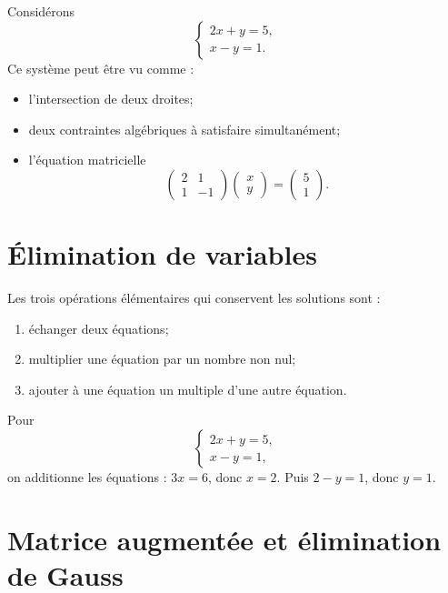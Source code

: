 Considérons
\[
\begin{cases}
2x+y=5,\\
x-y=1.
\end{cases}
\]
Ce système peut être vu comme :
\begin{itemize}
\item l'intersection de deux droites;
\item deux contraintes algébriques à satisfaire simultanément;
\item l'équation matricielle
\[
\begin{pmatrix}2&1\\1&-1\end{pmatrix}
\begin{pmatrix}x\\y\end{pmatrix}
=
\begin{pmatrix}5\\1\end{pmatrix}.
\]
\end{itemize}

\section{Élimination de variables}
\label{manual:section:12.02}

\begin{methodbox}
Les trois opérations élémentaires qui conservent les solutions sont :
\begin{enumerate}
\item échanger deux équations;
\item multiplier une équation par un nombre non nul;
\item ajouter à une équation un multiple d'une autre équation.
\end{enumerate}
\end{methodbox}

\begin{examplebox}
Pour
\[
\begin{cases}
2x+y=5,\\
x-y=1,
\end{cases}
\]
on additionne les équations : $3x=6$, donc $x=2$. Puis $2-y=1$, donc $y=1$.
\end{examplebox}

\section{Matrice augmentée et élimination de Gauss}
\label{manual:section:12.03}

